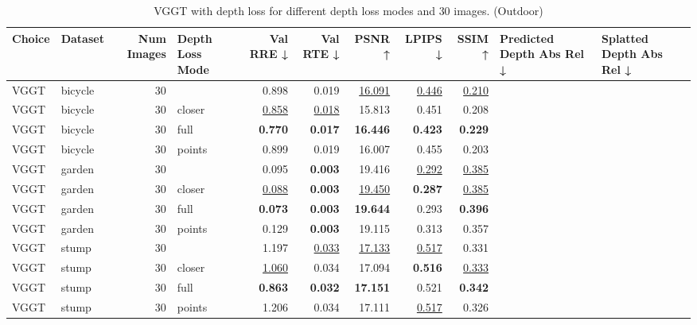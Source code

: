 \begin{table}[H]
\caption{VGGT with depth loss for different depth loss modes and $30$ images. (Outdoor)}
\label{tab:05_depth_loss_sparse_outdoor}
\centering
\scriptsize
\begin{tabular}{llrlrrrrrll}
\toprule
Choice & Dataset & Num Images & Depth Loss Mode & Val RRE ↓ & Val RTE ↓ & PSNR ↑ & LPIPS ↓ & SSIM ↑ & Predicted Depth Abs Rel ↓ & Splatted Depth Abs Rel ↓ \\
\midrule
VGGT & bicycle & 30 &  & 0.898 & 0.019 & \underline{16.091} & \underline{0.446} & \underline{0.210} &  &  \\
VGGT & bicycle & 30 & closer & \underline{0.858} & \underline{0.018} & 15.813 & 0.451 & 0.208 &  &  \\
VGGT & bicycle & 30 & full & \textbf{0.770} & \textbf{0.017} & \textbf{16.446} & \textbf{0.423} & \textbf{0.229} &  &  \\
VGGT & bicycle & 30 & points & 0.899 & 0.019 & 16.007 & 0.455 & 0.203 &  &  \\
\midrule
VGGT & garden & 30 &  & 0.095 & \textbf{0.003} & 19.416 & \underline{0.292} & \underline{0.385} &  &  \\
VGGT & garden & 30 & closer & \underline{0.088} & \textbf{0.003} & \underline{19.450} & \textbf{0.287} & \underline{0.385} &  &  \\
VGGT & garden & 30 & full & \textbf{0.073} & \textbf{0.003} & \textbf{19.644} & 0.293 & \textbf{0.396} &  &  \\
VGGT & garden & 30 & points & 0.129 & \textbf{0.003} & 19.115 & 0.313 & 0.357 &  &  \\
\midrule
VGGT & stump & 30 &  & 1.197 & \underline{0.033} & \underline{17.133} & \underline{0.517} & 0.331 &  &  \\
VGGT & stump & 30 & closer & \underline{1.060} & 0.034 & 17.094 & \textbf{0.516} & \underline{0.333} &  &  \\
VGGT & stump & 30 & full & \textbf{0.863} & \textbf{0.032} & \textbf{17.151} & 0.521 & \textbf{0.342} &  &  \\
VGGT & stump & 30 & points & 1.206 & 0.034 & 17.111 & \underline{0.517} & 0.326 &  &  \\
\bottomrule
\end{tabular}
\end{table}